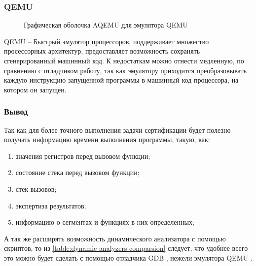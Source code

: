 \subsubsection{QEMU}\label{sec:ch1/sec3/sub2/sub2}
\begin{figure}[!htbp]
    \caption{Графическая оболочка AQEMU для эмулятора QEMU\label{fig:aqemu}}
\end{figure}
QEMU -- Быстрый эмулятор процессоров, поддерживает множество просессорных архитектур,
предоставляет возможность сохранять сгенерированный машинный код.
К недостаткам можно отнести медленную, по сравнению с отладчиком работу,
так как эмулятору приходится преобразовывать каждую инструкцию запущенной программы
в машинный код процессора, на котором он запущен.

\subsubsection{Вывод}\label{sec:ch1/sec3/sub2/sub3}

Так как для более точного выполнения задачи сертификации будет полезно получать
информацию времени выполнения программы, такую, как:
\begin{enumerate}
    \item значения регистров перед вызовом функции;
    \item состояние стека перед вызовом функции;
    \item стек вызовов;
    \item экспертиза результатов;
    \item информацию о сегментах и функциях в них определенных;
\end{enumerate}
А так же расширять возможность динамического анализатора с помощью скриптов,
то из \autoref{table:dynamic-analyzers-comparsion} следует, что
удобнее всего это можно будет сделать с помощью отладчика GDB \autocite{gdb},
нежели эмулятора QEMU \autocite{qemu}.


